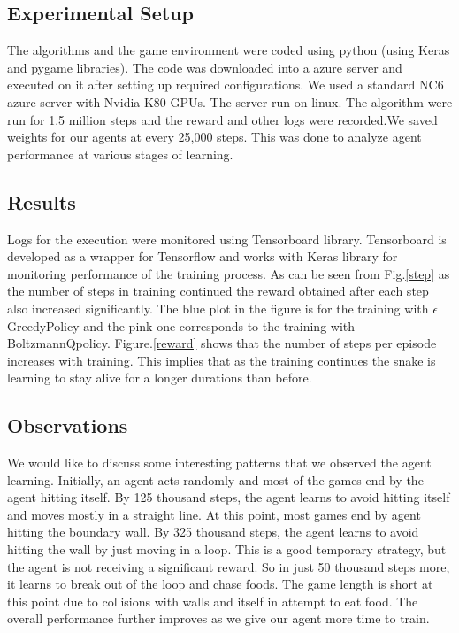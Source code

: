 \documentclass[conference,10pt]{IEEEtran}
\begin{document}
	\subsection{Experimental Setup}
	The algorithms and the game environment were coded using python (using Keras and pygame libraries). The code was downloaded into a azure server and executed on it after setting up required configurations. We used a standard NC6 azure server with Nvidia K80 GPUs. The server run on linux. 
	\break
	\break
	The algorithm were run for 1.5 million steps and the reward and other logs were recorded.We saved weights for our agents at every 25,000 steps. This was done to analyze agent performance at various stages of learning. 
	\subsection{Results}
	
	Logs for the execution were monitored using Tensorboard library. Tensorboard is developed as a wrapper for Tensorflow and works with Keras library for monitoring performance of the training process.
	\break
	\break
	As can be seen from Fig.\ref{step} as the number of steps in training continued the reward obtained after each step also increased significantly. The blue plot in the figure is for the training with \(\epsilon\)GreedyPolicy and the pink one corresponds to the training with BoltzmannQpolicy. 
	\break
	\break
	Figure.\ref{reward} shows that the number of steps per episode increases with training. This implies that as the training continues the snake is learning to stay alive for a longer durations than before. 
	
	\subsection{Observations}
	We would like to discuss some interesting patterns that we observed the agent learning. Initially, an agent acts randomly and most of the games end by the agent hitting itself. By 125 thousand steps, the agent learns to avoid hitting itself and moves mostly in a straight line. At this point, most games end by agent hitting the boundary wall. By 325 thousand steps,  the agent learns to avoid hitting the wall by just moving in a loop. This is a good temporary strategy, but the agent is not receiving a significant reward. So in just 50 thousand steps more, it learns to break out of the loop and chase foods. The game length is short at this point due to collisions with walls and itself in attempt to eat food. The overall performance further improves as we give our agent more time to train.
\end{document}
